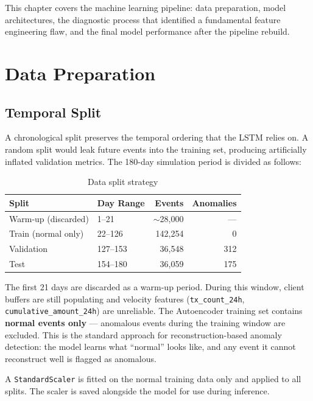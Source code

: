 This chapter covers the machine learning pipeline: data preparation, model
architectures, the diagnostic process that identified a fundamental feature
engineering flaw, and the final model performance after the pipeline rebuild.

\section{Data Preparation}

\subsection{Temporal Split}

A chronological split preserves the temporal ordering that the LSTM relies on.
A random split would leak future events into the training set, producing
artificially inflated validation metrics. The 180-day simulation period is
divided as follows:

\begin{table}[H]
\centering
\caption{Data split strategy}
\label{tab:data-split}
\begin{tabular}{@{}llrr@{}}
\toprule
\textbf{Split} & \textbf{Day Range} & \textbf{Events} & \textbf{Anomalies} \\
\midrule
Warm-up (discarded) & 1--21   & $\sim$28,000 & --- \\
Train (normal only)  & 22--126  & 142,254 & 0 \\
Validation           & 127--153 & 36,548  & 312 \\
Test                 & 154--180 & 36,059  & 175 \\
\bottomrule
\end{tabular}
\end{table}

The first 21 days are discarded as a warm-up period. During this window,
client buffers are still populating and velocity features
(\texttt{tx\_count\_24h}, \texttt{cumulative\_amount\_24h}) are unreliable.
The Autoencoder training set contains \textbf{normal events only} ---
anomalous events during the training window are excluded. This is the
standard approach for reconstruction-based anomaly detection: the model
learns what ``normal'' looks like, and any event it cannot reconstruct well
is flagged as anomalous.

A \texttt{StandardScaler} is fitted on the normal training data only and
applied to all splits. The scaler is saved alongside the model for use
during inference.

